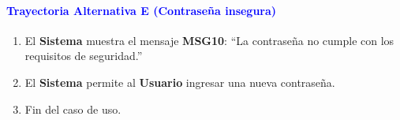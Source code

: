 \paragraph{\textbf{\textcolor{blue}{Trayectoria Alternativa E (Contraseña insegura)}}}
\begin{enumerate}
    \item El \textbf{Sistema} muestra el mensaje \textbf{MSG10}: ``La contraseña no cumple con los requisitos de seguridad.''
    \item El \textbf{Sistema} permite al \textbf{Usuario} ingresar una nueva contraseña.
    \item Fin del caso de uso.
\end{enumerate}


